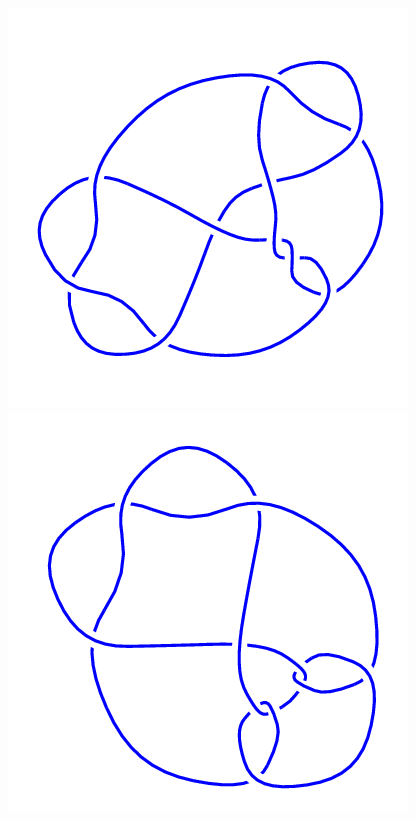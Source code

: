 \begin{figure}[H]
	\begin{minipage}[b]{.18\linewidth}
		\centering
		\includegraphics[width=\linewidth]{../data/10_142.png}
	\end{minipage}
	\begin{minipage}[b]{.18\linewidth}
		\centering
		\includegraphics[width=\linewidth]{../data/10_143.png}

\end{minipage}
\end{figure}
